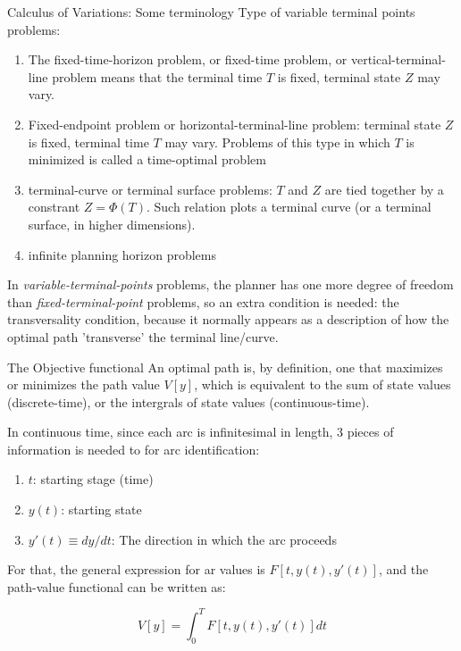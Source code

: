 \documentclass[10pt]{beamer}
\begin{document}
\begin{frame}[label={sec:org717f335}]{Calculus of Variations: Some terminology}
Type of \alert{variable terminal points} problems:
\begin{enumerate}
\item The \alert{fixed-time-horizon problem}, or \alert{fixed-time problem}, or \alert{vertical-terminal-line problem} means that the terminal time \(T\) is fixed, terminal state \(Z\) may vary.
\item \alert{Fixed-endpoint problem} or \alert{horizontal-terminal-line problem}: terminal state \(Z\) is fixed, terminal time \(T\) may vary. Problems of this type in which \(T\) is minimized is called a \alert{time-optimal problem}
\item \alert{terminal-curve} or \alert{terminal surface problems}: \(T\) and \(Z\) are tied together by a constrant \(Z = \Phi(T)\). Such relation plots a \alert{terminal curve} (or a \alert{terminal surface}, in higher dimensions).
\item infinite planning horizon problems
\end{enumerate}

In \emph{variable-terminal-points} problems, the planner has one more degree of freedom than \emph{fixed-terminal-point} problems, so an extra condition is needed: the \alert{transversality condition}, because it normally appears as a description of how the optimal path 'transverse' the terminal line/curve.
\end{frame}

\begin{frame}[label={sec:org4d6c0d5}]{The Objective functional}
An optimal path is, by definition, one that maximizes or minimizes the path value \(V[y]\), which is equivalent to the sum of state values (discrete-time), or the intergrals of state values (continuous-time).

In continuous time, since each arc is infinitesimal in length, 3 pieces of information is needed to for arc identification:
\begin{enumerate}
\item \(t\): starting stage (time)
\item \(y(t)\): starting state
\item \(y'(t) \equiv dy/dt\): The direction in which the arc proceeds
\end{enumerate}
For that, the general expression for ar values is \(F[t, y(t), y'(t)]\), and the path-value functional can be written as:

$$
V[y] = \int_{0}^{T} F[t, y(t), y\prime(t)] dt
$$
\end{frame}
\end{document}
